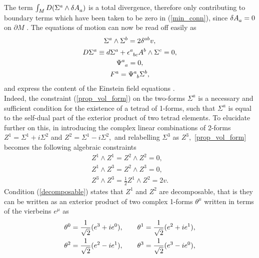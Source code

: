 \documentclass[a4paper,12pt, onecolumn, notitlepage]{article}
\theoremstyle{definition}
\theoremstyle{remark}
\newcommand{\m}{\mu}
\newcommand{\e}{\epsilon}
\begin{document}
The term $\int_{M} D(\Sigma\indices{^a}\wedge\delta A\indices{_a})$ is a total divergence, therefore only contributing to boundary terms which have been taken to be zero in (\ref{min_conn}), since $\delta A\indices{_a}=0$ on $\partial M$ \cite{gasperini_2013}. The equations of motion can now be read off easily as
\begin{subequations}
	\begin{gather}
\label{prop_vol_form}
\Sigma^{a}\wedge\Sigma^{b} = 2\delta^{ab}v,\\
\label{cov_derivative}
D\Sigma^{a} \equiv d\Sigma^{a} + \e\indices{^a_b_c}A^{b}\wedge\Sigma^{c} = 0,\\
\label{traceless}
\Psi\indices{^a_a} = 0,\\
\label{weyl}
F^{a} = \Psi\indices{^a_b}\Sigma^{b},
	\end{gather}
\end{subequations}
and express the content of the Einstein field equations \cite{capovilla_1989, capovilla_1993}.\\
Indeed, the constraint (\ref{prop_vol_form}) on the two-forms $\Sigma^{a}$ is a necessary and sufficient condition for the existence of a tetrad of 1-forms, such that $\Sigma^{a}$ is equal to the self-dual part of the exterior product of two tetrad elements.
To elucidate further on this, in introducing the complex linear combinations of 2-forms $Z^{1} = \Sigma^{1}+ i\Sigma^{2}$ and $Z^{2} = \Sigma^{1}- i\Sigma^{2},$ and relabelling $\Sigma^{3}$ as $Z^{3},$ \cref{prop_vol_form} becomes the following algebraic constraints
\begin{subequations}
	\begin{gather}
	\label{decomposable}
	Z^{1}\wedge Z^{1}=Z^{2}\wedge Z^{2}=0,\\
	\label{orthogonal}
	Z^{1}\wedge Z^{3}= Z^{2}\wedge Z^{3}=0,\\
	\label{frame}
	Z^{3}\wedge Z^{3}=\frac{1}{2}Z^{1}\wedge Z^{2}=2v.
	\end{gather}
\end{subequations}
Condition (\ref{decomposable}) states that $Z^{1}$ and $Z^{2}$ are decomposable, that is they can be written as an exterior product of two complex 1-forms $\theta^{\m}$ written in terms of the vierbeins $e^{\mu}$ as
\begin{gather*}
\theta\indices{^0}=\frac{1}{\sqrt{2}}(e\indices{^3}+ie\indices{^0}),\qquad\theta\indices{^1}=\frac{1}{\sqrt{2}}(e\indices{^2}+ie\indices{^1}),\\
\theta\indices{^2}=\frac{1}{\sqrt{2}}(e\indices{^2}-ie\indices{^1}),\qquad\theta\indices{^3}=\frac{1}{\sqrt{2}}(e\indices{^3}-ie\indices{^0}),
\end{gather*}
\end{document}
